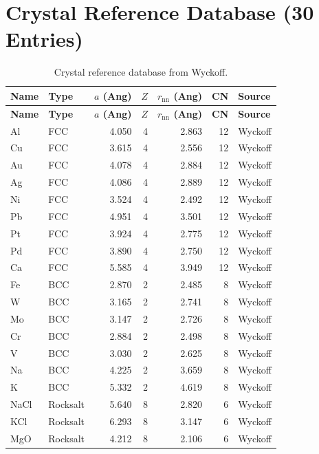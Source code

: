 \documentclass[11pt,twoside]{article}
\def\AA{Ang}%
\begin{document}
\section{Crystal Reference Database (30 Entries)}
\label{app:crystals}

\begin{longtable}{llrrrrl}
\caption{Crystal reference database from Wyckoff.} \\
\toprule
\textbf{Name} & \textbf{Type} & \textbf{$a$ (\AA)} & \textbf{$Z$} & \textbf{$r_{\mathrm{nn}}$ (\AA)} & \textbf{CN} & \textbf{Source} \\
\midrule
\endfirsthead
\toprule
\textbf{Name} & \textbf{Type} & \textbf{$a$ (\AA)} & \textbf{$Z$} & \textbf{$r_{\mathrm{nn}}$ (\AA)} & \textbf{CN} & \textbf{Source} \\
\midrule
\endhead
Al   & FCC      & 4.050 & 4 & 2.863 & 12 & Wyckoff \\
Cu   & FCC      & 3.615 & 4 & 2.556 & 12 & Wyckoff \\
Au   & FCC      & 4.078 & 4 & 2.884 & 12 & Wyckoff \\
Ag   & FCC      & 4.086 & 4 & 2.889 & 12 & Wyckoff \\
Ni   & FCC      & 3.524 & 4 & 2.492 & 12 & Wyckoff \\
Pb   & FCC      & 4.951 & 4 & 3.501 & 12 & Wyckoff \\
Pt   & FCC      & 3.924 & 4 & 2.775 & 12 & Wyckoff \\
Pd   & FCC      & 3.890 & 4 & 2.750 & 12 & Wyckoff \\
Ca   & FCC      & 5.585 & 4 & 3.949 & 12 & Wyckoff \\
Fe   & BCC      & 2.870 & 2 & 2.485 & 8  & Wyckoff \\
W    & BCC      & 3.165 & 2 & 2.741 & 8  & Wyckoff \\
Mo   & BCC      & 3.147 & 2 & 2.726 & 8  & Wyckoff \\
Cr   & BCC      & 2.884 & 2 & 2.498 & 8  & Wyckoff \\
V    & BCC      & 3.030 & 2 & 2.625 & 8  & Wyckoff \\
Na   & BCC      & 4.225 & 2 & 3.659 & 8  & Wyckoff \\
K    & BCC      & 5.332 & 2 & 4.619 & 8  & Wyckoff \\
NaCl & Rocksalt & 5.640 & 8 & 2.820 & 6  & Wyckoff \\
KCl  & Rocksalt & 6.293 & 8 & 3.147 & 6  & Wyckoff \\
MgO  & Rocksalt & 4.212 & 8 & 2.106 & 6  & Wyckoff \\

\end{longtable}
\end{document}
